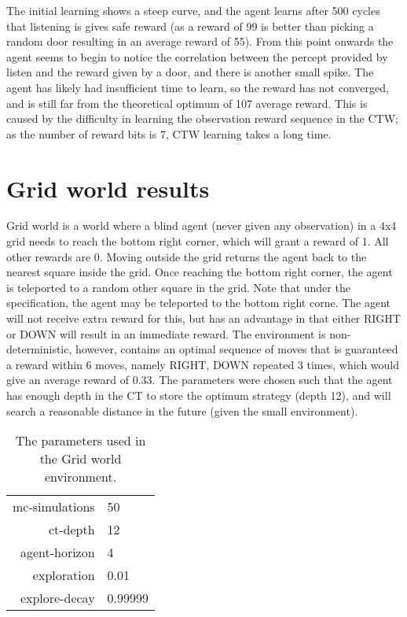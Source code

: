 \documentclass[pdftex,twoside,a4paper]{report}
\begin{document}
The initial learning shows a steep curve, and the agent learns after 500 cycles that listening is gives safe reward (as a reward of 99 is better than picking a random door resulting in an average reward of 55). From this point onwards the agent seems to begin to notice the correlation between the percept provided by listen and the reward given by a door, and there is another small spike. The agent has likely had insufficient time to learn, so the reward has not converged, and is still far from the theoretical optimum of 107 average reward. This is caused by the difficulty in learning the observation reward sequence in the CTW; as the number of reward bits is 7, CTW learning takes a long time.

\section{Grid world results}
Grid world is a world where a blind agent (never given any observation) in a 4x4 grid needs to reach the bottom right corner, which will grant a reward of 1. All other rewards are 0. Moving outside the grid returns the agent back to the nearest square inside the grid. Once reaching the bottom right corner, the agent is teleported to a random other square in the grid. Note that under the specification, the agent may be teleported to the bottom right corne. The agent will not receive extra reward for this, but has an advantage in that either RIGHT or DOWN will result in an immediate reward. The environment is non-deterministic, however, contains an optimal sequence of moves that is guaranteed a reward within 6 moves, namely RIGHT, DOWN repeated 3 times, which would give an average reward of 0.33. The parameters were chosen such that the agent has enough depth in the CT to store the optimum strategy (depth 12), and will search a reasonable distance in the future (given the small environment).

\begin{table}[h]
\begin{center}
\begin{tabular}{| r | l | }
\hline
mc-simulations & 50\\
ct-depth & 12\\
agent-horizon & 4\\
exploration & 0.01\\
explore-decay & 0.99999\\
\hline
\end{tabular}
\caption{The parameters used in the Grid world environment.}
\end{center}
\end{table}
\end{document}
